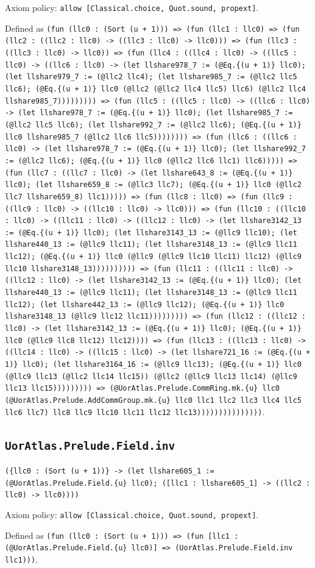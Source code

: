 \documentclass[11pt]{article}
\begin{document}
\noindent Axiom policy: \texttt{allow [Classical.choice, Quot.sound, propext]}.\par
\noindent Defined as \texttt{(fun (llc0 : (Sort (u + 1))) => (fun (llc1 : llc0) => (fun (llc2 : ((llc2 : llc0) -> ((llc3 : llc0) -> llc0))) => (fun (llc3 : ((llc3 : llc0) -> llc0)) => (fun (llc4 : ((llc4 : llc0) -> ((llc5 : llc0) -> ((llc6 : llc0) -> (let llshare978\_7 := (@Eq.\{(u + 1)\} llc0); (let llshare979\_7 := (@llc2 llc4); (let llshare985\_7 := (@llc2 llc5 llc6); (@Eq.\{(u + 1)\} llc0 (@llc2 (@llc2 llc4 llc5) llc6) (@llc2 llc4 llshare985\_7))))))))) => (fun (llc5 : ((llc5 : llc0) -> ((llc6 : llc0) -> (let llshare978\_7 := (@Eq.\{(u + 1)\} llc0); (let llshare985\_7 := (@llc2 llc5 llc6); (let llshare992\_7 := (@llc2 llc6); (@Eq.\{(u + 1)\} llc0 llshare985\_7 (@llc2 llc6 llc5)))))))) => (fun (llc6 : ((llc6 : llc0) -> (let llshare978\_7 := (@Eq.\{(u + 1)\} llc0); (let llshare992\_7 := (@llc2 llc6); (@Eq.\{(u + 1)\} llc0 (@llc2 llc6 llc1) llc6))))) => (fun (llc7 : ((llc7 : llc0) -> (let llshare643\_8 := (@Eq.\{(u + 1)\} llc0); (let llshare659\_8 := (@llc3 llc7); (@Eq.\{(u + 1)\} llc0 (@llc2 llc7 llshare659\_8) llc1))))) => (fun (llc8 : llc0) => (fun (llc9 : ((llc9 : llc0) -> ((llc10 : llc0) -> llc0))) => (fun (llc10 : ((llc10 : llc0) -> ((llc11 : llc0) -> ((llc12 : llc0) -> (let llshare3142\_13 := (@Eq.\{(u + 1)\} llc0); (let llshare3143\_13 := (@llc9 llc10); (let llshare440\_13 := (@llc9 llc11); (let llshare3148\_13 := (@llc9 llc11 llc12); (@Eq.\{(u + 1)\} llc0 (@llc9 (@llc9 llc10 llc11) llc12) (@llc9 llc10 llshare3148\_13)))))))))) => (fun (llc11 : ((llc11 : llc0) -> ((llc12 : llc0) -> (let llshare3142\_13 := (@Eq.\{(u + 1)\} llc0); (let llshare440\_13 := (@llc9 llc11); (let llshare3148\_13 := (@llc9 llc11 llc12); (let llshare442\_13 := (@llc9 llc12); (@Eq.\{(u + 1)\} llc0 llshare3148\_13 (@llc9 llc12 llc11))))))))) => (fun (llc12 : ((llc12 : llc0) -> (let llshare3142\_13 := (@Eq.\{(u + 1)\} llc0); (@Eq.\{(u + 1)\} llc0 (@llc9 llc8 llc12) llc12)))) => (fun (llc13 : ((llc13 : llc0) -> ((llc14 : llc0) -> ((llc15 : llc0) -> (let llshare721\_16 := (@Eq.\{(u + 1)\} llc0); (let llshare3164\_16 := (@llc9 llc13); (@Eq.\{(u + 1)\} llc0 (@llc9 llc13 (@llc2 llc14 llc15)) (@llc2 (@llc9 llc13 llc14) (@llc9 llc13 llc15))))))))) => (@UorAtlas.Prelude.CommRing.mk.\{u\} llc0 (@UorAtlas.Prelude.AddCommGroup.mk.\{u\} llc0 llc1 llc2 llc3 llc4 llc5 llc6 llc7) llc8 llc9 llc10 llc11 llc12 llc13)))))))))))))))}.\par
\subsection*{\texttt{UorAtlas.Prelude.Field.inv}}
\noindent\texttt{(\{llc0 : (Sort (u + 1))\} -> (let llshare605\_1 := (@UorAtlas.Prelude.Field.\{u\} llc0); ([llc1 : llshare605\_1] -> ((llc2 : llc0) -> llc0))))}\par
\noindent Axiom policy: \texttt{allow [Classical.choice, Quot.sound, propext]}.\par
\noindent Defined as \texttt{(fun (llc0 : (Sort (u + 1))) => (fun [llc1 : (@UorAtlas.Prelude.Field.\{u\} llc0)] => (UorAtlas.Prelude.Field.inv llc1)))}.\par
\end{document}
